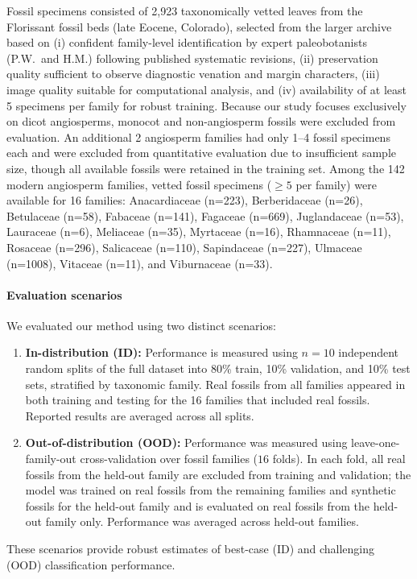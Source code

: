 \documentclass[pdflatex,lineno,sn-nature]{sn-jnl}%
\theoremstyle{plain}%
\theoremstyle{definition}%
\theoremstyle{remark}%
\begin{document}
Fossil specimens consisted of 2,923 taxonomically vetted leaves from the Florissant fossil beds (late Eocene, Colorado), selected from the larger archive~\citep{Wilf2024LeafDatasetV2} based on (i) confident family-level identification by expert paleobotanists (P.W.\ and H.M.) following published systematic revisions, (ii) preservation quality sufficient to observe diagnostic venation and margin characters, (iii) image quality suitable for computational analysis, and (iv) availability of at least 5 specimens per family for robust training. Because our study focuses exclusively on dicot angiosperms, monocot and non-angiosperm fossils were excluded from evaluation. An additional 2 angiosperm families had only 1--4 fossil specimens each and were excluded from quantitative evaluation due to insufficient sample size, though all available fossils were retained in the training set. Among the 142 modern angiosperm families, vetted fossil specimens ($\geq 5$ per family) were available for 16 families: Anacardiaceae (n=223), Berberidaceae (n=26), Betulaceae (n=58), Fabaceae (n=141), Fagaceae (n=669), Juglandaceae (n=53), Lauraceae (n=6), Meliaceae (n=35), Myrtaceae (n=16), Rhamnaceae (n=11), Rosaceae (n=296), Salicaceae (n=110), Sapindaceae (n=227), Ulmaceae (n=1008), Vitaceae (n=11), and Viburnaceae (n=33). 


\paragraph{Evaluation scenarios}
We evaluated our method using two distinct scenarios:
\begin{enumerate}
    \item \textbf{In-distribution (ID):} Performance is measured using $n=10$ independent random splits of the full dataset into 80\% train, 10\% validation, and 10\% test sets, stratified by taxonomic family. Real fossils from all families appeared in both training and testing for the 16 families that included real fossils. Reported results are averaged across all splits.
    \item \textbf{Out-of-distribution (OOD):} Performance was measured using leave-one-family-out cross-validation over fossil families ($16$ folds). In each fold, all real fossils from the held-out family are excluded from training and validation; the model was trained on real fossils from the remaining families and synthetic fossils for the held-out family and is evaluated on real fossils from the held-out family only. Performance was averaged across held-out families.
\end{enumerate}
These scenarios provide robust estimates of best-case (ID) and challenging (OOD) classification performance. 
\end{document}
